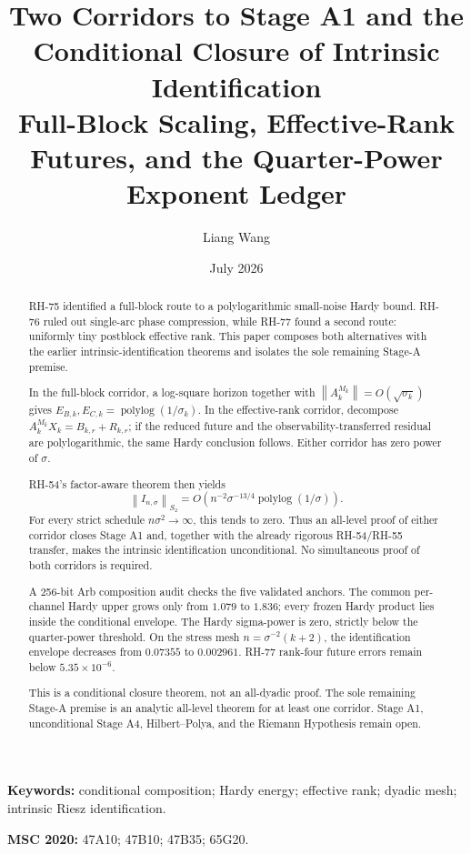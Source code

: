 \documentclass[11pt]{article}
\title{Two Corridors to Stage A1 and the Conditional Closure of Intrinsic Identification\\
\large Full-Block Scaling, Effective-Rank Futures, and the Quarter-Power Exponent Ledger}
\author{Liang Wang}
\date{July 2026}
\newcommand{\norm}[1]{\left\lVert#1\right\rVert}
\begin{document}
\maketitle

\begin{abstract}
RH-75 identified a full-block route to a polylogarithmic small-noise Hardy
bound.  RH-76 ruled out single-arc phase compression, while RH-77 found a
second route: uniformly tiny postblock effective rank.  This paper composes
both alternatives with the earlier intrinsic-identification theorems and
isolates the sole remaining Stage-A premise.

In the full-block corridor, a log-square horizon together with
$\norm{A_k^{M_k}}=O(\sqrt{\sigma_k})$ gives
$E_{B,k},E_{C,k}=\operatorname{polylog}(1/\sigma_k)$.  In the effective-rank
corridor, decompose $A_k^{M_k}X_k=B_{k,r}+R_{k,r}$; if the reduced future and
the observability-transferred residual are polylogarithmic, the same Hardy
conclusion follows.  Either corridor has zero power of $\sigma$.

RH-54's factor-aware theorem then yields
\[
 \norm{I_{n,\sigma}}_{S_2}
 =O\!\left(n^{-2}\sigma^{-13/4}
 \operatorname{polylog}(1/\sigma)\right).
\]
For every strict schedule $n\sigma^2\to\infty$, this tends to zero.  Thus an
all-level proof of either corridor closes Stage A1 and, together with the
already rigorous RH-54/RH-55 transfer, makes the intrinsic identification
unconditional.  No simultaneous proof of both corridors is required.

A 256-bit Arb composition audit checks the five validated anchors.  The common
per-channel Hardy upper grows only from $1.079$ to $1.836$; every frozen Hardy
product lies inside the conditional envelope.  The Hardy sigma-power is zero,
strictly below the quarter-power threshold.  On the stress mesh
$n=\sigma^{-2}(k+2)$, the identification envelope decreases from $0.07355$
to $0.002961$.  RH-77 rank-four future errors remain below
$5.35\times10^{-6}$.

This is a conditional closure theorem, not an all-dyadic proof.  The sole
remaining Stage-A premise is an analytic all-level theorem for at least one
corridor.  Stage A1, unconditional Stage A4, Hilbert--Polya, and the Riemann
Hypothesis remain open.
\end{abstract}

\noindent\textbf{Keywords:} conditional composition; Hardy energy;
effective rank; dyadic mesh; intrinsic Riesz identification.

\medskip
\noindent\textbf{MSC 2020:} 47A10; 47B10; 47B35; 65G20.
\end{document}

